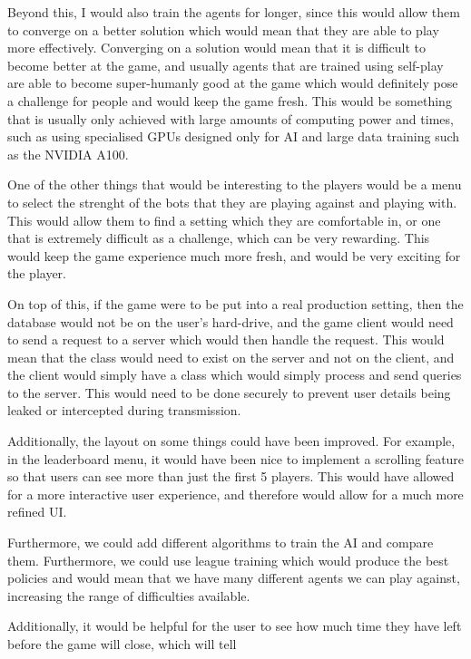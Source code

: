 \vs
Beyond this, I would also train the agents for longer, since this would allow them to converge on a better solution which would mean that they are able to play more effectively. Converging on a solution would mean that it is difficult to become better at the game, and usually agents that are trained using self-play are able to become super-humanly good at the game which would definitely pose a challenge for people and would keep the game fresh. This would be something that is usually only achieved with large amounts of computing power and times, such as using specialised GPUs designed only for AI and large data training such as the NVIDIA A100.

\vs
One of the other things that would be interesting to the players would be a menu to select the strenght of the bots that they are playing against and playing with. This would allow them to find a setting which they are comfortable in, or one that is extremely difficult as a challenge, which can be very rewarding. This would keep the game experience much more fresh, and would be very exciting for the player.

\vs
On top of this, if the game were to be put into a real production setting, then the database would not be on the user's hard-drive, and the game client would need to send a request to a server which would then handle the request. This would mean that the  class would need to exist on the server and not on the client, and the client would simply have a  class which would simply process and send queries to the server. This would need to be done securely to prevent user details being leaked or intercepted during transmission.

\vs

Additionally, the layout on some things could have been improved. For example, in the leaderboard menu, it would have been nice to implement a scrolling feature so that users can see more than just the first 5 players. This would have allowed for a more interactive user experience, and therefore would allow for a much more refined UI.

\vs
Furthermore, we could add different algorithms to train the AI and compare them. Furthermore, we could use league training which would produce the best policies and would mean that we have many different agents we can play against, increasing the range of difficulties available.

\vs
Additionally, it would be helpful for the user to see how much time they have left before the game will close, which will tell 

